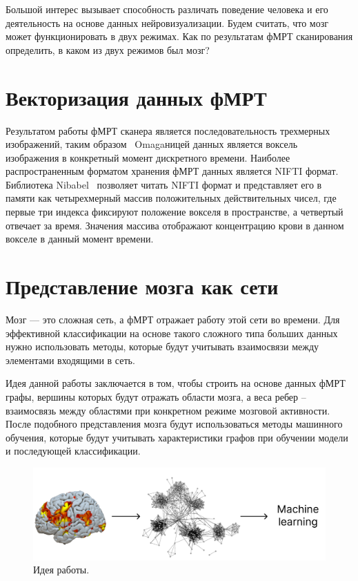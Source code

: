 \documentclass[specialist,
substylefile = spbu_report.rtx,
subf,href,colorlinks=true, 12pt]{disser}
\begin{document}
			Большой интерес вызывает способность различать поведение человека и его деятельность на основе данных нейровизуализации. Будем считать, что мозг может функционировать в двух режимах. Как по результатам фМРТ сканирования определить, в каком из двух режимов был мозг? 
			
		\section{Векторизация данных фМРТ}
			Результатом работы фМРТ сканера является последовательность трехмерных изображений, таким образом \ Omagaницей данных является воксель изображения в конкретный момент дискретного времени. Наиболее распространенным форматом хранения фМРТ данных является NIFTI формат. Библиотека Nibabel~\cite{BrettMatthew2023} позволяет читать NIFTI формат и представляет его в памяти как четырехмерный массив положительных действительных чисел, где первые три индекса фиксируют положение вокселя в пространстве, а четвертый отвечает за время. Значения массива отображают концентрацию крови в данном вокселе в данный момент времени.
			
		\section{Представление мозга как сети}
			Мозг --- это сложная сеть, а фМРТ отражает работу этой сети во времени. Для эффективной классификации на основе такого сложного типа больших данных нужно использовать методы, которые будут учитывать взаимосвязи между элементами входящими в сеть.
			
			Идея данной работы заключается в том, чтобы строить на основе данных фМРТ графы, вершины которых будут отражать области мозга, а веса ребер – взаимосвязь между областями при конкретном режиме мозговой активности. После подобного представления мозга будут использоваться методы машинного обучения, которые будут учитывать характеристики графов при обучении модели и последующей классификации.
			
			\begin{figure}[h]
				\centering
				\includegraphics[width=12cm]{../images/fmri_graph_ml_1.pdf}
				\caption{Идея работы.} 
				\label{fg:1}
			\end{figure}
			
\end{document}
